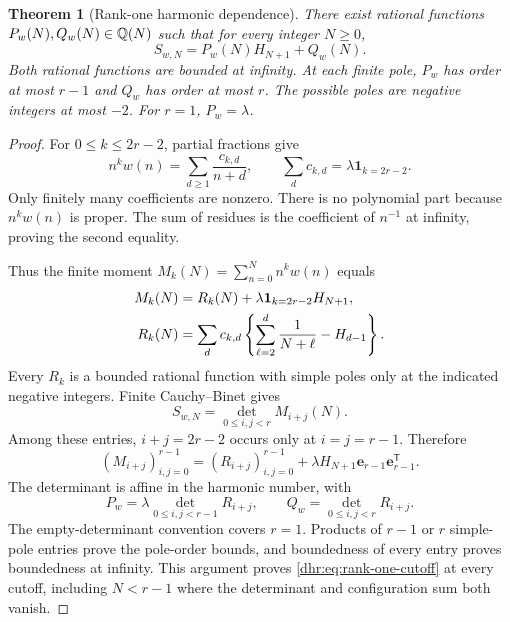 \documentclass[11pt,letterpaper]{article}
\numberwithin{equation}{section}
\newtheorem{theorem}{Theorem}[section]
\theoremstyle{definition}\newtheorem{definition}[theorem]{Definition}
\theoremstyle{remark}\newtheorem{remark}[theorem]{Remark}
\newcommand{\ind}{\mathbf1}
\begin{document}
\begin{theorem}[Rank-one harmonic dependence]\label{dhr:thm:rank-one}
There exist rational functions $P_w(N),Q_w(N)\in\mathbb Q(N)$ such that
for every integer $N\geq0$,
\begin{equation}\label{dhr:eq:rank-one-cutoff}
 \boxed{S_{w,N}=P_w(N)H_{N+1}+Q_w(N).}
\end{equation}
Both rational functions are bounded at infinity. At each finite pole,
$P_w$ has order at most $r-1$ and $Q_w$ has order at most $r$.
The possible poles are negative integers at most $-2$.
For $r=1$, $P_w=\lambda$.
\end{theorem}

\begin{proof}
For $0\leq k\leq2r-2$, partial fractions give
\begin{equation}\label{dhr:eq:moment-residues}
 n^kw(n)=\sum_{d\geq1}\frac{c_{k,d}}{n+d},\qquad
 \sum_dc_{k,d}=\lambda\ind_{k=2r-2}.
\end{equation}
Only finitely many coefficients are nonzero. There is no polynomial
part because $n^kw(n)$ is proper. The sum of residues is the coefficient
of $n^{-1}$ at infinity, proving the second equality.

Thus the finite moment $M_k(N)=\sum_{n=0}^Nn^kw(n)$ equals
\begin{align}
 M_k(N)&=R_k(N)+\lambda\ind_{k=2r-2}H_{N+1},\notag\\
 R_k(N)&=\sum_dc_{k,d}\left\{
       \sum_{\ell=2}^{d}\frac1{N+\ell}-H_{d-1}\right\}.
 \label{dhr:eq:finite-moments}
\end{align}
Every $R_k$ is a bounded rational function with simple poles only
at the indicated negative integers. Finite Cauchy--Binet gives
\begin{equation}\label{dhr:eq:hankel-cutoff}
 S_{w,N}=\det_{0\leq i,j<r}M_{i+j}(N).
\end{equation}
Among these entries, $i+j=2r-2$ occurs only at $i=j=r-1$.
Therefore
\begin{equation}\label{dhr:eq:rank-one-matrix}
 (M_{i+j})_{i,j=0}^{r-1}
 =(R_{i+j})_{i,j=0}^{r-1}
       +\lambda H_{N+1}\bm e_{r-1}\bm e_{r-1}^{\mathsf T}.
\end{equation}
The determinant is affine in the harmonic number, with
\begin{equation}\label{dhr:eq:PQ-det}
 P_w=\lambda\det_{0\leq i,j<r-1}R_{i+j},\qquad
 Q_w=\det_{0\leq i,j<r}R_{i+j}.
\end{equation}
The empty-determinant convention covers $r=1$. Products of $r-1$
or $r$ simple-pole entries prove the pole-order bounds, and boundedness
of every entry proves boundedness at infinity. This argument proves
\eqref{dhr:eq:rank-one-cutoff} at every cutoff, including $N<r-1$
where the determinant and configuration sum both vanish.
\end{proof}
\end{document}
